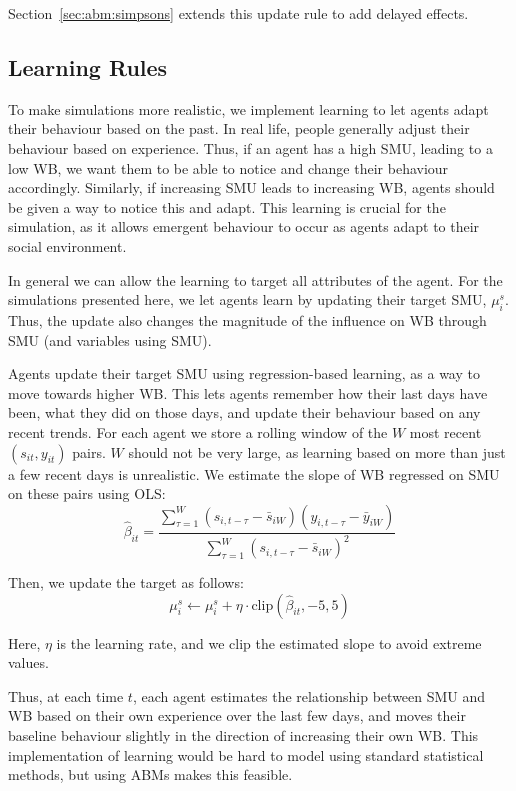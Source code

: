 Section~\ref{sec:abm:simpsons} extends this update rule to add delayed effects.

\subsection{Learning Rules}
\label{sec:abm:learning}
To make simulations more realistic, we implement learning to let agents adapt their behaviour based on the past. In real life, people generally adjust their behaviour based on experience. Thus, if an agent has a high SMU, leading to a low WB, we want them to be able to notice and change their behaviour accordingly. Similarly, if increasing SMU leads to increasing WB, agents should be given a way to notice this and adapt. This learning is crucial for the simulation, as it allows emergent behaviour to occur as agents adapt to their social environment.

In general we can allow the learning to target all attributes of the agent. For the simulations presented here, we let agents learn by updating their target SMU, $\mu^s_i$. Thus, the update also changes the magnitude of the influence on WB through SMU (and variables using SMU).

Agents update their target SMU using regression-based learning, as a way to move towards higher WB\@. This lets agents remember how their last days have been, what they did on those days, and update their behaviour based on any recent trends. For each agent we store a rolling window of the $W$ most recent $(s_{it}, y_{it})$ pairs. $W$ should not be very large, as learning based on more than just a few recent days is unrealistic. We estimate the slope of WB regressed on SMU on these pairs using OLS:
\begin{equation}
    \hat{\beta}_{it} = \frac{\sum_{\tau=1}^{W}(s_{i,t-\tau} - \bar{s}_{iW})(y_{i,t-\tau} - \bar{y}_{iW})}{\sum_{\tau=1}^{W}{(s_{i,t-\tau} - \bar{s}_{iW})}^2}
\end{equation}

Then, we update the target as follows:
\begin{equation}
    \mu^s_i \leftarrow \mu^s_i + \eta \cdot \text{clip}(\hat{\beta}_{it}, -5, 5)
\end{equation}

Here, $\eta$ is the learning rate, and we clip the estimated slope to avoid extreme values.

Thus, at each time $t$, each agent estimates the relationship between SMU and WB based on their own experience over the last few days, and moves their baseline behaviour slightly in the direction of increasing their own WB\@. This implementation of learning would be hard to model using standard statistical methods, but using ABMs makes this feasible.


